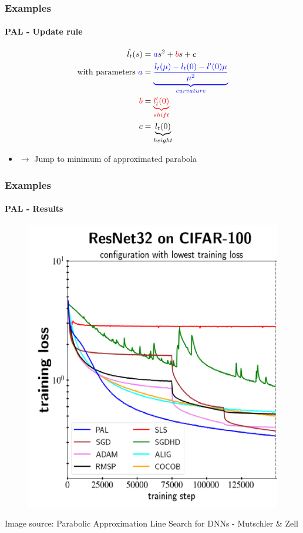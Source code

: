\documentclass[9pt]{beamer}
\begin{document}
\begin{frame}
\frametitle{Examples}
\framesubtitle{PAL - Update rule}
\begin{align*}
	\hat{l_t}(s) &= \color{blue}a\color{black}s^2 \color{black}+ \color{red}b\color{black}s \color{black} + c\\
	\text{with parameters } \color{blue}a &=\color{blue}\underbrace{\frac{l_t(\mu) - l_t(0) - l'(0)\mu}{\mu^2}}_{curvature}\\
	\color{red} b&= \color{red}\underbrace{l_t'(0)}_{shift}\\
	c &= \underbrace{l_t(0)}_{height}
\end{align*}
\begin{itemize}
	\item $\rightarrow$ Jump to minimum of approximated parabola
\end{itemize}
\end{frame}

\begin{frame}
\frametitle{Examples}
\framesubtitle{PAL - Results}
\begin{figure}
	\includegraphics[width=.6\linewidth]{figures/pal_2.png}
\end{figure}
\tiny\color{lightgray}Image source: Parabolic Approximation Line Search for DNNs - Mutschler \& Zell
\end{frame}
\end{document}
